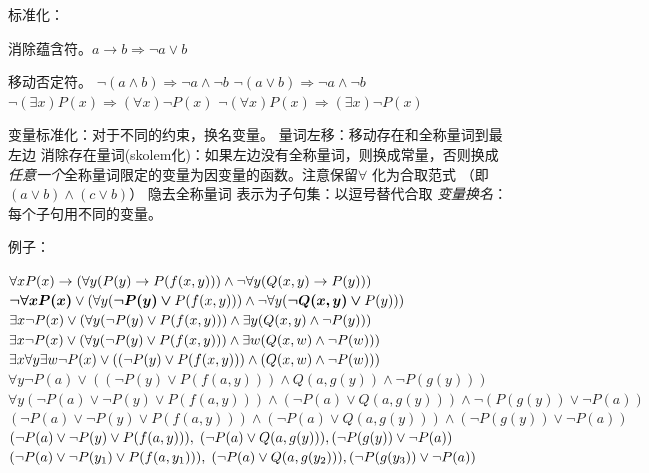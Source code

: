 \documentclass[twocolumn,zihao=5,linespread=1,heading=false,autoindent=0pt]{ctexart}
\DeclarePairedDelimiter{\paren}{(}{)}
\theoremstyle{exampstyle} \newtheorem{definition}{定义}[section]
\theoremstyle{exampstyle} \newtheorem{example}{例}[section]
\theoremstyle{exampstyle} \newtheorem{theorem}{定理}[section]
\theoremstyle{exampstyle} \newtheorem{lemma}{引理}[section]
\theoremstyle{exampstyle} \newtheorem{myproof}{证明}[section]
\begin{document}
\begin{multicols}{2}
标准化：
\begin{outline}[cenumerate]
    \1 消除蕴含符。$a \to b \Rightarrow \lnot a \lor b $

    \1 移动否定符。
        \2 $\lnot(a \land b) \Rightarrow \lnot a \land \lnot b $
        \2 $\lnot(a \lor b) \Rightarrow \lnot a \land \lnot b$
        \2 $\lnot(\exists x)P(x) \Rightarrow (\forall x)\lnot P(x)$
        \2 $\lnot(\forall x)P(x) \Rightarrow (\exists x)\lnot P(x)$
    
    \1 变量标准化：对于不同的约束，换名变量。
    \1 量词左移：移动存在和全称量词到最左边
    \1 消除存在量词(skolem化)：如果左边没有全称量词，则换成常量，否则换成\emph{任意一个}全称量词限定的变量为因变量的函数。注意保留$\forall$
    \1 化为合取范式 （即$(a \lor b) \land (c \lor b)$）
    \1 隐去全称量词
    \1 表示为子句集：以逗号替代合取
    \1 \emph{变量换名}：每个子句用不同的变量。
\end{outline}
\end{multicols}
例子：
\begin{outline}[cenumerate]
    \1 $\forall x P(x) \to \paren*{\forall y \paren*{P(y) \to P(f(x, y))} \land \lnot \forall y \paren*{Q(x, y) \to P(y)}}$
    \1 $\bm{\lnot \forall x P(x)} \lor \paren*{\forall y \paren*{\bm{\lnot P(y) \lor} P(f(x, y))} \land \lnot \forall y \paren*{ \bm{\lnot Q(x, y) \lor } P(y)}}$
    \1 $\exists x \lnot P(x) \lor \paren*{\forall y \paren*{\lnot P(y) \lor P(f(x, y))} \land \exists y \paren*{Q(x, y) \land \lnot  P(y)}}$
    \1 $\exists x \lnot P(x) \lor \paren*{\forall y \paren*{\lnot P(y) \lor P(f(x, y))} \land \exists w \paren*{Q(x, w) \land \lnot  P(w)}}$
    \1 $\exists x \forall y \exists w \lnot P(x) \lor \paren*{\paren*{\lnot P(y) \lor P(f(x, y))} \land  \paren*{Q(x, w) \land \lnot  P(w)}}$
    \1 $\forall y \lnot P(a) \lor ((\lnot P(y) \lor P(f(a, y))) \land  Q(a, g(y)) \land \lnot  P(g(y)))$
    \1 $\forall y (\lnot P(a) \lor \lnot P(y) \lor P(f(a, y))) \land  (\lnot P(a) \lor Q(a, g(y))) \land  \lnot  (P(g(y)) \lor \lnot P(a))$
    \1 $(\lnot P(a) \lor \lnot P(y) \lor P(f(a, y))) \land  (\lnot P(a) \lor Q(a, g(y))) \land  (\lnot P(g(y)) \lor \lnot P(a))$
    \1 $(\lnot P(a) \lor \lnot P(y)\lor P(f(a, y))) ,\;  (\lnot P(a) \lor Q(a, g(y))) ,\; \\  (\lnot P(g(y)) \lor \lnot P(a))$
    \1 $(\lnot P(a) \lor \lnot P(y_1) \lor P(f(a, y_1))) ,\;  (\lnot P(a) \lor Q(a, g(y_2))) ,\; \\  (\lnot P(g(y_3)) \lor \lnot P(a))$
\end{outline}
\end{document}
